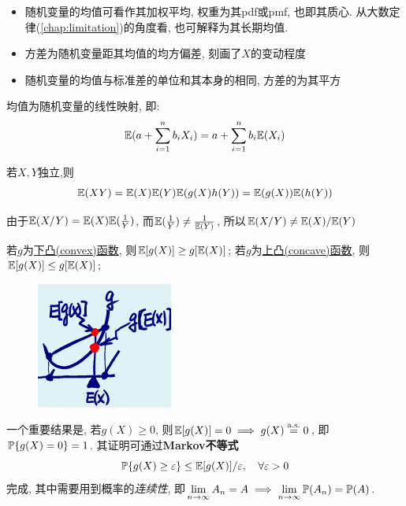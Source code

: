 \begin{remark}
    \begin{itemize}
        \item 随机变量的均值可看作其加权平均, 权重为其pdf或pmf, 也即其质心. 从大数定律(\ref{chap:limitation})的角度看, 也可解释为其长期均值.
        \item 方差为随机变量距其均值的均方偏差, 刻画了$X$的变动程度
        \item 随机变量的均值与标准差的单位和其本身的相同, 方差的为其平方
    \end{itemize}
\end{remark}

\begin{theorem}
    均值为随机变量的线性映射, 即:
    \[ \E(a+\sum_{i=1}^n b_i X_i)=a+\sum_{i=1}^n b_i\E( X_i) \]
\end{theorem}

\begin{theorem}[]
    若$X,Y$独立,则
    \begin{gather*}
        \E(XY)=\E(X)\E(Y)
        \E(g(X)h(Y))=\E(g(X))\E(h(Y))
    \end{gather*}
\end{theorem}

\begin{remark}
    由于$\E(X/Y)= \E(X)\E(\frac{1}{Y})$, 而$\E(\frac{1}{Y}) \neq \frac{1}{\E(Y)}$, 所以$\E(X/Y)\neq \E(X)/\E(Y)$
\end{remark}

\begin{theorem}
    若$g$为\underline{下凸(convex)函数}, 则$\E[g(X)] \ge g[\E(X)]$; 若$g$为\underline{上凸(concave)函数}, 则$\E[g(X)] \le  g[\E(X)]$;
\end{theorem}

\begin{figure}
    \centering
    \includegraphics{image/trans_mean.png}
\end{figure}

一个重要结果是, 若$g(X) \ge 0$, 则$\E[g(X)] = 0 \implies g(X) \overset{\as}{=} 0$, 即$\P\{g(X)=0\} = 1$. 其证明可通过\textbf{Markov不等式}
\[ \P\{g(X)\ge\e\} \le \E[g(X)]/\e, \quad \forall \e > 0 \]
完成, 其中需要用到概率的\emph{连续性}, 即$\lim\limits_{n\to\infty}A_{n} = A \implies \lim\limits_{n\to\infty}\P(A_{n}) = \P(A)$.

